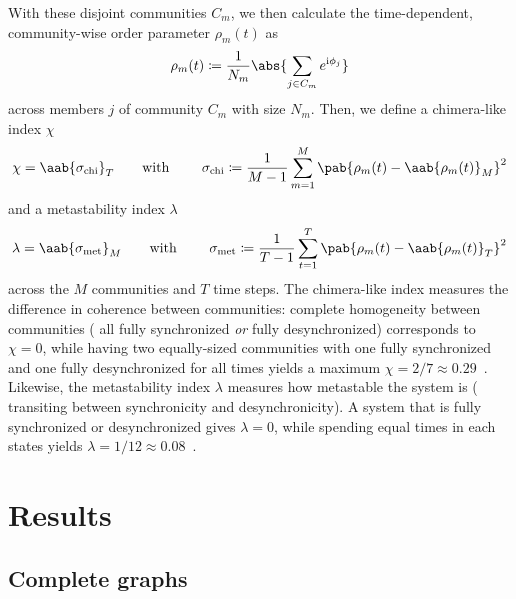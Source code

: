 \documentclass[pdflatex,lineno,referee,sn-nature]{sn-jnl}
\begin{document}
With these disjoint communities $C_m$, we then calculate
the time-dependent, community-wise order parameter $\rho_m(t)$
as
\begin{equation}
  \rho_m(t) \coloneqq \frac{1}{N_m} \abs{\sum_{j \in C_m} e^{\im \phi_j}}
\end{equation}
across members $j$ of community $C_m$ with size $N_m$.
Then, we define a chimera-like index $\chi$
\begin{equation}
  \chi = \aab{
    \sigma_{\text{chi}}}_T
    \text{\qquad with \qquad}
    \sigma_{\text{chi}} \coloneqq \frac{1}{M-1} \sum_{m=1}^M
    \pab{\rho_m(t) - \aab{\rho_m(t)}_M}^2
  \label{eq:chimera_index}
\end{equation}
and a metastability index $\lambda$
\begin{equation}
  \lambda = \aab{
    \sigma_{\text{met}}}_M
    \text{\qquad with \qquad}
    \sigma_{\text{met}} \coloneqq \frac{1}{T-1} \sum_{t=1}^T
    \pab{\rho_m(t) - \aab{\rho_m(t)}_T}^2
  \label{eq:metastability_index}
\end{equation}
across the $M$ communities and $T$ time steps.
The chimera-like index measures the difference in coherence between communities:
complete homogeneity between communities
(\eg{} all fully synchronized \emph{or} fully desynchronized)
corresponds to $\chi = 0$,
while having two equally-sized communities
with one fully synchronized and one fully desynchronized
for all times yields a maximum $\chi = 2/7 \approx
\num{0.29}$~\citep{shanahan2010metastable}.
Likewise, the metastability index $\lambda$ measures how metastable
the system is (\ie{} transiting between synchronicity and desynchronicity).
A system that is fully synchronized or desynchronized gives $\lambda = 0$,
while spending equal times in each states yields $\lambda = 1/12
\approx \num{0.08}$~\citep{shanahan2010metastable}.

\section{Results}
\label{sec:results}
\subsection{Complete graphs}
\label{sec:complete_graph}
\end{document}
